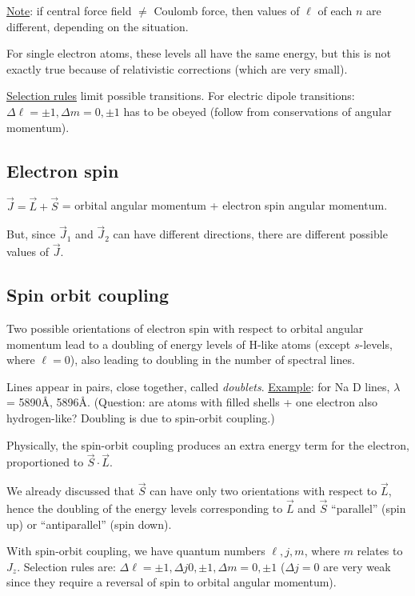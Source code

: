 \documentclass[11pt]{article}
\newcommand{\mar}[1]{\hspace{0pt}\marginpar{-\textcolor{black}{#1}-}}
\begin{document}
\mar{I 4}\underline{Note}: if central force field $\neq$ Coulomb force,
then values of $\ell$ of each $n$ are different, depending on the situation.

\mar{I 5}For single electron atoms, these levels all have the same energy,
but this is not exactly true because of relativistic corrections
(which are very small).

\underline{Selection rules} limit possible transitions. For electric
dipole transitions: $\Delta\ell = \pm 1, \Delta{m} = 0, \pm 1$
has to be obeyed (follow from conservations of angular momentum).

\subsection{Electron spin}
\mar{I 6}$\vec{J} = \vec{L} + \vec{S}$ = orbital angular momentum + electron
spin angular momentum.

\mar{I 7}But, since $\vec{J}_{1}$ and $\vec{J}_{2}$ can have different directions,
there are different possible values of $\vec{J}$.

\subsection{Spin orbit coupling}
\mar{I 8}Two possible orientations of electron spin with respect to orbital
angular momentum lead to a doubling of energy levels of H-like atoms (except
$s$-levels, where $\ell=0$), also leading to doubling in the number of spectral
lines.

Lines appear in pairs, close together, called \textit{doublets}.
\underline{Example}: for Na D lines, $\lambda$ = 5890\AA{}, 5896\AA{}.
(Question: are atoms with filled shells + one electron also hydrogen-like?
Doubling is due to spin-orbit coupling.)

Physically, the spin-orbit coupling produces an extra energy term for the
electron, proportioned to $\vec{S}\cdot\vec{L}$.

We already discussed that $\vec{S}$ can have only two orientations with respect
to $\vec{L}$, hence the doubling of the energy levels corresponding to
$\vec{L}$ and $\vec{S}$ ``parallel'' (spin up) or ``antiparallel'' (spin down).

With spin-orbit coupling, we have quantum numbers $\ell, j, m$, where $m$
relates to $J_{z}$. Selection rules are:
$\Delta\ell = \pm 1, \Delta{j} 0, \pm 1, \Delta{m} = 0, \pm 1$
($\Delta{j} = 0$ are very weak since they require a reversal of spin to
orbital angular momentum).
\end{document}
